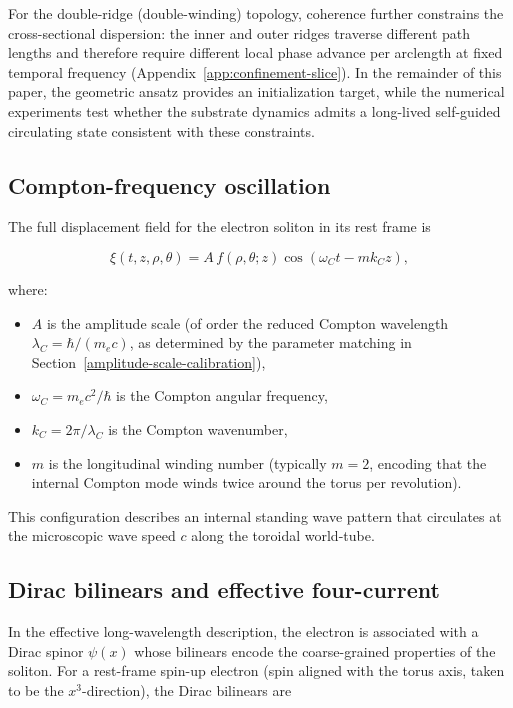 For the double-ridge (double-winding) topology, coherence further constrains the cross-sectional
dispersion: the inner and outer ridges traverse different path lengths and therefore require different
local phase advance per arclength at fixed temporal frequency (Appendix~\ref{app:confinement-slice}).
In the remainder of this paper, the geometric ansatz provides an initialization target, while the
numerical experiments test whether the substrate dynamics admits a long-lived self-guided circulating
state consistent with these constraints.

\subsection{Compton-frequency oscillation}

The full displacement field for the electron soliton in its rest frame is

\begin{equation}
\xi(t,z,\rho,\theta) = A \, f(\rho,\theta;z) \cos(\omega_C t - m k_C z),
\label{eq:xi-electron-init}
\end{equation}

where:
\begin{itemize}
\item $A$ is the amplitude scale (of order the reduced Compton wavelength
  $\lambda_C = \hbar/(m_e c)$, as determined by the parameter matching in
  Section~\ref{amplitude-scale-calibration}),
\item $\omega_C = m_e c^2 / \hbar$ is the Compton angular frequency,
\item $k_C = 2\pi / \lambda_C$ is the Compton wavenumber,
\item $m$ is the longitudinal winding number (typically $m=2$, encoding that the
  internal Compton mode winds twice around the torus per revolution).
\end{itemize}

This configuration describes an internal standing wave pattern that circulates
at the microscopic wave speed $c$ along the toroidal world-tube.

\subsection{Dirac bilinears and effective four-current}

In the effective long-wavelength description, the electron is associated with a
Dirac spinor $\psi(x)$ whose bilinears encode the coarse-grained properties of
the soliton. For a rest-frame spin-up electron (spin aligned with the torus
axis, taken to be the $x^3$-direction), the Dirac bilinears are

